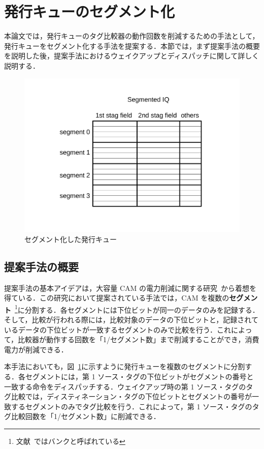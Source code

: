 \documentclass[submit,techrep,noauthor]{ipsj}
\newcommand{\fig}[1]{{図~\ref{fig:#1}}}
\begin{document}
\section{発行キューのセグメント化}
\label{sec:segmented_IQ}
本論文では，発行キューのタグ比較器の動作回数を削減するための手法として，発行キューをセグメント化する手法を提案する．本節では，まず提案手法の概要を説明した後，提案手法におけるウェイクアップとディスパッチに関して詳しく説明する．

\begin{figure}[htb]
  \centering
  \includegraphics[keepaspectratio, scale=.8]{segmentedIQ.pdf}
  \caption{セグメント化した発行キュー}
  \label{fig:segmentedIQ}
\end{figure}

\subsection{提案手法の概要}
提案手法の基本アイデアは，大容量 CAM の電力削減に関する研究~\cite{Motomura1990paper,Motomura1990journal}から着想を得ている．この研究において提案されている手法では，CAM を複数の\textbf{セグメント}~\footnote{文献~\cite{Motomura1990paper,Motomura1990journal}ではバンクと呼ばれている}に分割する．各セグメントには下位ビットが同一のデータのみを記録する．そして，比較が行われる際には，比較対象のデータの下位ビットと，記録されているデータの下位ビットが一致するセグメントのみで比較を行う．これによって，比較器が動作する回数を「1/セグメント数」まで削減することができ，消費電力が削減できる．

本手法においても，\fig{segmentedIQ}に示すように発行キューを複数のセグメントに分割する．各セグメントには，第 1 ソース・タグの下位ビットがセグメントの番号と一致する命令をディスパッチする．ウェイクアップ時の第 1 ソース・タグのタグ比較では，ディスティネーション・タグの下位ビットとセグメントの番号が一致するセグメントのみでタグ比較を行う．これによって，第 1 ソース・タグのタグ比較回数を「1/セグメント数」に削減できる．
\end{document}
